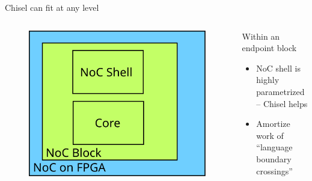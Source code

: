 \documentclass{beamer}
\begin{document}
\begin{frame}{Chisel can fit at any level}
\begin{columns}
  \begin{column}{0.4\textwidth}
    \begin{figure}
      \centering
      \includegraphics[width=\textwidth]{figs/chisel_3.svg}
    \end{figure}
  \end{column}
  \begin{column}{0.6\textwidth}
    Within an endpoint block
    \begin{itemize}
      \item NoC shell is highly parametrized -- Chisel helps
      \item Amortize work of ``language boundary crossings''
    \end{itemize}
  \end{column}
\end{columns}
\end{frame}
\end{document}
